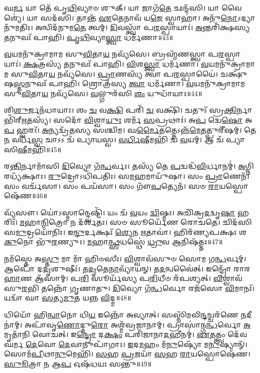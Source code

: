 𑌘\-\ul{𑌰𑍍𑌮} 𑌯𑌾 𑌤𑍇᳴ 𑌪𑍃\-\ul{𑌥𑌿}\-𑌵𑍍𑌯𑌾𑍞 𑌶𑍁𑌕𑍍। 
𑌯𑌾 𑌜𑌾𑌗᳴\-\ul{𑌤𑍇} 𑌛𑌨𑍍𑌦᳴𑌸𑌿। 
𑌯𑌾 𑌵𑍈𑌶𑍍𑌯𑍇॑। 
𑌯𑌾 𑌸𑌦᳴𑌸𑌿। 
𑌤𑌾𑌨𑍍𑌤᳴ \ul{𑌏}\-𑌤𑍇𑌨𑌾𑌵᳴ 𑌯\-\ul{𑌜𑍇} 𑌸𑍍𑌵𑌾𑌹𑌾॑। 
𑌅𑌨𑍁᳴\-\ul{𑌨𑍋}\-𑌽𑌦𑍍𑌯𑌾𑌨𑍁᳴𑌮𑌤𑌿𑌃। 
𑌅𑌨𑍍𑌵𑌿𑌦᳴𑌨𑍁𑌮\-\ul{𑌤𑍇} 𑌤𑍍𑌵𑌮𑍍। 
\-\ul{𑌦𑌿}\-𑌵𑌸𑍍𑌤𑍍𑌵𑌾᳴ 𑌪\-\ul{𑌰}\-𑌸𑍍𑌪𑌾𑌯𑌾𑌃॑। 
\-\ul{𑌅}\-𑌨𑍍𑌤𑌰𑌿᳴𑌕𑍍𑌷𑌸𑍍𑌯 \ul{𑌤}\-𑌨𑍁𑌵𑌃᳴ 𑌪𑌾𑌹𑌿। 
\-\ul{𑌪𑍃}\-\-\ul{𑌥𑌿}\-𑌵𑍍𑌯𑌾\-\ul{𑌸𑍍𑌤𑍍𑌵𑌾} 𑌧𑌰𑍍𑌮᳴𑌣𑌾॥43॥

\-\ul{𑌵}\-𑌯𑌮𑌨𑍁᳴𑌕𑍍𑌰𑌾𑌮𑌾𑌮 𑌸𑍁\-\ul{𑌵𑌿}\-𑌤𑌾\-\ul{𑌯} 𑌨𑌵𑍍𑌯᳴𑌸𑍇। 
𑌬𑍍𑌰𑌹𑍍𑌮᳴𑌣𑌸𑍍𑌤𑍍𑌵𑌾 𑌪\-\ul{𑌰}\-𑌸𑍍𑌪𑌾𑌯𑌾𑌃॑। 
\-\ul{𑌕𑍍𑌷}\-𑌤𑍍𑌰𑌸𑍍𑌯᳴ \ul{𑌤}\-𑌨𑍁𑌵𑌃᳴ 𑌪𑌾𑌹𑌿। 
\-\ul{𑌵𑌿}\-𑌶\-\ul{𑌸𑍍𑌤𑍍𑌵𑌾} 𑌧𑌰𑍍𑌮᳴𑌣𑌾। 
\-\ul{𑌵}\-𑌯𑌮𑌨𑍁᳴𑌕𑍍𑌰𑌾𑌮𑌾𑌮 𑌸𑍁\-\ul{𑌵𑌿}\-𑌤𑌾\-\ul{𑌯} 𑌨𑌵𑍍𑌯᳴𑌸𑍇। 
\-\ul{𑌪𑍍𑌰𑌾}\-𑌣𑌸𑍍𑌯᳴ 𑌤𑍍𑌵𑌾 𑌪\-\ul{𑌰}\-𑌸𑍍𑌪𑌾𑌯𑍈॑। 
𑌚𑌕𑍍𑌷𑍁᳴𑌷\-\ul{𑌸𑍍𑌤}\-𑌨𑍁𑌵𑌃᳴ 𑌪𑌾𑌹𑌿। 
𑌶𑍍𑌰𑍋𑌤𑍍𑌰᳴𑌸𑍍𑌯 \ul{𑌤𑍍𑌵𑌾} 𑌧𑌰𑍍𑌮᳴𑌣𑌾। 
\-\ul{𑌵}\-𑌯𑌮𑌨𑍁᳴𑌕𑍍𑌰𑌾𑌮𑌾𑌮 𑌸𑍁\-\ul{𑌵𑌿}\-𑌤𑌾\-\ul{𑌯} 𑌨𑌵𑍍𑌯᳴𑌸𑍇। 
\-\ul{𑌵}\-𑌲𑍍𑌗𑍁𑌰᳴𑌸𑌿 \ul{𑌶𑌂} 𑌯𑍁𑌧𑌾᳴𑌯𑌾𑌃॥44॥

𑌶𑌿\-\ul{𑌶𑍁}\-𑌰𑍍𑌜𑌨᳴𑌧𑌾𑌯𑌾𑌃। 
𑌶𑌂 \ul{𑌚} 𑌵\-\ul{𑌕𑍍𑌷𑌿} 𑌪𑌰𑌿᳴ \ul{𑌚} 𑌵𑌕𑍍𑌷𑌿᳴। 
𑌚𑌤𑍁𑌃᳴ 𑌸𑍍𑌰\-\ul{𑌕𑍍𑌤𑌿}\-𑌰𑍍𑌨𑌾𑌭𑌿᳴𑌰𑍍\mbox{}\-\ul{𑌋}\-𑌤𑌸𑍍𑌯᳴। 
𑌸𑌦𑍋᳴ \ul{𑌵𑌿}\-𑌶𑍍𑌵𑌾\-\ul{𑌯𑍁𑌃} 𑌶𑌰𑍍𑌮᳴ \ul{𑌸}\-𑌪𑍍𑌰𑌥𑌾𑌃॑। 
𑌅\-\ul{𑌪} 𑌦𑍍𑌵𑍇\-\ul{𑌷𑍋} 𑌅\-\ul{𑌪} 𑌹𑍍𑌵𑌰𑌃᳴। 
\-\ul{𑌅}\-𑌨𑍍𑌯𑌦𑍍𑌵𑍍𑌰᳴𑌤𑌸𑍍𑌯 𑌸𑌶𑍍𑌚𑌿𑌮। 
𑌘\-\ul{𑌰𑍍𑌮𑍈}\-𑌤𑌤𑍍𑌤𑍇𑌽𑌨𑍍𑌨᳴\-\ul{𑌮𑍇}\-𑌤𑌤𑍍𑌪𑍁𑌰𑍀᳴𑌷𑌮𑍍। 
𑌤𑍇\-\ul{𑌨} 𑌵𑌰𑍍𑌧᳴\-\ul{𑌸𑍍𑌵} 𑌚𑌾𑌽𑌽 𑌚᳴ 𑌪𑍍𑌯𑌾𑌯𑌸𑍍𑌵। 
\-\ul{𑌵}\-\-\ul{𑌰𑍍𑌧𑌿}\-\-\ul{𑌷𑍀}\-𑌮𑌹𑌿᳴ 𑌚 \ul{𑌵}\-𑌯𑌮𑍍। 
𑌆 𑌚᳴ 𑌪𑍍𑌯𑌾𑌸𑌿\-\ul{𑌷𑍀}\-𑌮𑌹𑌿᳴॥45॥

𑌰\-\ul{𑌨𑍍𑌤𑌿}\-𑌰𑍍𑌨𑌾𑌮𑌾᳴𑌸𑌿 \ul{𑌦𑌿}\-𑌵𑍍𑌯𑍋 𑌗᳴\-\ul{𑌨𑍍𑌧}\-𑌰𑍍𑌵𑌃। 
𑌤𑌸𑍍𑌯᳴ 𑌤𑍇 \ul{𑌪}\-𑌦𑍍𑌵𑌦𑍍𑌧᳴\-\ul{𑌵𑌿}\-𑌰𑍍𑌧𑌾𑌨𑌮𑍍॑। 
\-\ul{𑌅}\-𑌗𑍍𑌨𑌿𑌰𑌧𑍍𑌯᳴𑌕𑍍𑌷𑌾𑌃। 
\-\ul{𑌰𑍁}\-𑌦𑍍𑌰𑍋𑌽𑌧𑌿᳴𑌪𑌤𑌿𑌃। 
𑌸\-\ul{𑌮}\-𑌹𑌮𑌾𑌯𑍁᳴𑌷𑌾। 
𑌸𑌂 \ul{𑌪𑍍𑌰𑌾}\-𑌣𑍇𑌨᳴। 
𑌸𑌂 𑌵𑌰𑍍𑌚᳴𑌸𑌾। 
𑌸𑌂 𑌪𑌯᳴𑌸𑌾। 
𑌸𑌂 𑌗𑍗᳴\-\ul{𑌪}\-𑌤𑍍𑌯𑍇𑌨᳴। 
𑌸𑍞 \ul{𑌰𑌾}\-𑌯𑌸𑍍𑌪𑍋𑌷𑍇᳴𑌣॥46॥

𑌵𑍍𑌯᳴𑌸𑍗। 
𑌯𑍋॑𑌽𑌸𑍍𑌮𑌾𑌨𑍍𑌦𑍍𑌵𑍇𑌷𑍍𑌟𑌿᳴। 
𑌯𑌂 𑌚᳴ \ul{𑌵}\-𑌯𑌂 \ul{𑌦𑍍𑌵𑌿}\-𑌷𑍍𑌮𑌃। 
𑌅𑌚𑌿᳴𑌕𑍍𑌰\-\ul{𑌦}\-𑌦𑍍𑌵𑍃\-\ul{𑌷𑌾} 𑌹𑌰𑌿𑌃᳴। 
\-\ul{𑌮}\-𑌹𑌾\-\ul{𑌨𑍍𑌮𑌿}\-𑌤𑍍𑌰𑍋 𑌨 𑌦᳴𑌰𑍍\mbox{}\-\ul{𑌶}\-𑌤𑌃। 
𑌸𑍞 𑌸𑍂𑌰𑍍𑌯𑍇᳴𑌣 𑌰𑍋𑌚𑌤𑍇। 
𑌚𑌿𑌦᳴𑌸𑌿 𑌸\-\ul{𑌮𑍁}\-𑌦𑍍𑌰𑌯𑍋᳴𑌨𑌿𑌃। 
𑌇\-\ul{𑌨𑍍𑌦𑍁}\-𑌰𑍍𑌦𑌕𑍍𑌷𑌃᳴ \ul{𑌶𑍍𑌯𑍇}\-𑌨 \ul{𑌋}\-𑌤𑌾𑌵𑌾॑। 
𑌹𑌿𑌰᳴𑌣𑍍𑌯𑌪𑌕𑍍𑌷𑌃  𑌶\-\ul{𑌕𑍁}\-𑌨𑍋 𑌭𑍁᳴\-\ul{𑌰}\-𑌣𑍍𑌯𑍁𑌃। 
\-\ul{𑌮}\-𑌹𑌾\-\ul{𑌨𑍍𑌥𑍍𑌸}\-𑌧𑌸𑍍𑌥𑍇॑ \ul{𑌧𑍍𑌰𑍁}\-𑌵 𑌆𑌨𑌿𑌷᳴𑌤𑍍𑌤𑌃॥47॥

𑌨𑌮᳴𑌸𑍍𑌤𑍇 𑌅\-\ul{𑌸𑍍𑌤𑍁} 𑌮𑌾 𑌮𑌾᳴ 𑌹𑌿𑍞𑌸𑍀𑌃। 
\-\ul{𑌵𑌿}\-𑌶𑍍𑌵𑌾𑌵᳴𑌸𑍁𑍞 𑌸𑍋𑌮 𑌗\-\ul{𑌨𑍍𑌧}\-𑌰𑍍𑌵𑌮𑍍। 
𑌆𑌪𑍋᳴ 𑌦\-\ul{𑌦𑍃}\-𑌶𑍁𑌷𑍀𑌃॑। 
𑌤\-\ul{𑌦𑍃}\-𑌤𑍇\-\ul{𑌨𑌾}\-𑌵𑍍𑌯𑌾᳴𑌯𑌨𑍍। 
𑌤\-\ul{𑌦}\-𑌨𑍍𑌵𑌵𑍈॑𑌤𑍍। 
𑌇𑌨𑍍𑌦𑍍𑌰𑍋᳴ 𑌰𑌾𑌰\-\ul{𑌹𑌾}\-𑌣 𑌆᳴𑌸𑌾𑌮𑍍। 
𑌪\-\ul{𑌰𑌿} 𑌸𑍂𑌰𑍍𑌯᳴𑌸𑍍𑌯 𑌪\-\ul{𑌰𑌿}\-𑌧𑍀𑍞 𑌰᳴𑌪𑌶𑍍𑌯𑌤𑍍। 
\-\ul{𑌵𑌿}\-𑌶𑍍𑌵𑌾𑌵᳴𑌸𑍁\-\ul{𑌰}\-𑌭𑌿 𑌤𑌨𑍍𑌨𑍋᳴ 𑌗𑍃𑌣𑌾𑌤𑍁। 
\-\ul{𑌦𑌿}\-𑌵𑍍𑌯𑍋 𑌗᳴\-\ul{𑌨𑍍𑌧}\-𑌰𑍍𑌵𑍋 𑌰𑌜᳴𑌸𑍋 \ul{𑌵𑌿}\-𑌮𑌾𑌨𑌃᳴। 
𑌯𑌦𑍍𑌵𑌾᳴ 𑌘𑌾 \ul{𑌸}\-𑌤𑍍𑌯\-\ul{𑌮𑍁}\-𑌤 𑌯𑌨𑍍𑌨 \ul{𑌵𑌿}\-𑌦𑍍𑌮॥48॥

𑌧𑌿𑌯𑍋᳴ 𑌹𑌿\-\ul{𑌨𑍍𑌵𑌾}\-𑌨𑍋 𑌧𑌿\-\ul{𑌯} 𑌇𑌨𑍍𑌨𑍋᳴ 𑌅𑌵𑍍𑌯𑌾𑌤𑍍। 
𑌸𑌸𑍍𑌨𑌿᳴𑌮𑌵𑌿\-\ul{𑌨𑍍𑌦}\-𑌚𑍍𑌚𑌰᳴𑌣𑍇 \ul{𑌨}\-𑌦𑍀𑌨𑌾॑𑌮𑍍। 
𑌅𑌪𑌾᳴𑌵𑍃\-\ul{𑌣𑍋}\-𑌦𑍍𑌦𑍁\-\ul{𑌰𑍋} 𑌅𑌶𑍍𑌮᳴𑌵𑍍𑌰𑌜𑌾𑌨𑌾𑌮𑍍। 
𑌪𑍍𑌰𑌾𑌸𑌾॑𑌨𑍍𑌗\-\ul{𑌨𑍍𑌧}\-𑌰𑍍𑌵𑍋 \ul{𑌅}\-𑌮𑍃𑌤𑌾᳴𑌨𑌿 𑌵𑍋𑌚𑌤𑍍। 
𑌇\-\ul{𑌨𑍍𑌦𑍍𑌰𑍋} 𑌦\-\ul{𑌕𑍍𑌷𑌂} 𑌪𑌰𑌿᳴𑌜𑌾𑌨𑌾\-\ul{𑌦}\-𑌹𑍀𑌨𑌮𑍍॑। 
\-\ul{𑌏}\-𑌤𑌤𑍍𑌤𑍍𑌵𑌂 𑌦𑍇᳴𑌵 𑌘𑌰𑍍𑌮 \ul{𑌦𑍇}\-𑌵𑍋 \ul{𑌦𑍇}\-𑌵𑌾𑌨𑍁𑌪𑌾᳴𑌗𑌾𑌃। 
\-\ul{𑌇}\-𑌦\-\ul{𑌮}\-𑌹𑌂 𑌮᳴\-\ul{𑌨𑍁}\-𑌷𑍍𑌯𑍋᳴ 𑌮\-\ul{𑌨𑍁}\-𑌷𑍍𑌯𑌾𑌨𑍍᳴। 
𑌸𑍋𑌮᳴\-\ul{𑌪𑍀}\-𑌥𑌾\-\ul{𑌨𑍁}\-𑌮𑍇𑌹𑌿᳴। 
\-\ul{𑌸}\-𑌹 \ul{𑌪𑍍𑌰}\-𑌜𑌯𑌾᳴ \ul{𑌸}\-𑌹 \ul{𑌰𑌾}\-𑌯𑌸𑍍𑌪𑍋𑌷𑍇᳴𑌣। 
\-\ul{𑌸𑍁}\-\-\ul{𑌮𑌿}\-𑌤𑍍𑌰𑌾 \ul{𑌨} 𑌆\-\ul{𑌪} 𑌓𑌷᳴𑌧𑌯𑌃 𑌸𑌨𑍍𑌤𑍁॥49॥

